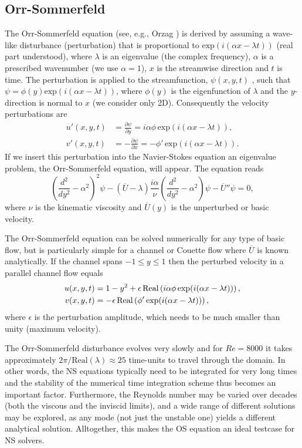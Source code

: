 \subsection{Orr-Sommerfeld}
\label{sec:OS}
The Orr-Sommerfeld equation (see, e.g., Orzag \cite{orzag71}) is derived by assuming a wave-like disturbance (perturbation) that is proportional to $\text{exp}(i(\alpha x-\lambda t))$ (real part understood), where $\lambda$ is an eigenvalue (the complex frequency), $\alpha$ is a prescribed wavenumber (we use $\alpha=1$), $x$ is the streamwise direction and $t$ is time. The perturbation is applied to the streamfunction, $\psi(x,y,t)$ , such that $\psi=\phi(y) \text{exp}(i(\alpha x- \lambda t))$, where $\phi(y)$ is the eigenfunction of $\lambda$ and the $y$-direction is normal to $x$ (we consider only 2D). Consequently the velocity perturbations are
\begin{align}
 u'(x,y,t)&=\frac{\partial \psi}{\partial y}=i\alpha \phi \, \text{exp}(i(\alpha x- \lambda t)),\\
 v'(x,y,t)&=-\frac{\partial \psi}{\partial x}=-\phi' \, \text{exp}(i(\alpha x- \lambda t)).
\end{align}
If we insert this perturbation into the Navier-Stokes equation an eigenvalue problem, the Orr-Sommerfeld equation, will appear. The equation reads
\begin{equation}
 \left( \frac{d^2}{dy^2}-\alpha^2\right)^2\psi - \left(\overline{U}-\lambda \right) \frac{i \alpha}{\nu} \left( \frac{d^2}{dy^2}-\alpha^2\right)\psi - \overline{U}''\psi=0,
 \label{eq:OrrS}
\end{equation}
where $\nu$ is the kinematic viscosity and $\overline{U}(y)$ is the unperturbed or basic velocity.

The Orr-Sommerfeld equation can be solved numerically for any type of basic flow, but is particularly simple for a channel or Couette flow where $\overline{U}$ is known analytically. If the channel spans $-1\leq y \leq 1$ then the perturbed velocity in a parallel channel flow equals
\begin{align}
 u(x,y,t)&=1-y^2+\epsilon \,\text{Real}\left(i\alpha \phi \, \text{exp}(i(\alpha x-\lambda t))\right), \notag \\
 v(x,y,t)&=-\epsilon \, \text{Real}\left(\phi' \, \text{exp}(i(\alpha x-\lambda t))\right),
\label{eq:channel}
\end{align}
where $\epsilon$ is the perturbation amplitude, which needs to be much smaller than unity (maximum velocity).

The Orr-Sommerfeld disturbance evolves very slowly and for $Re=8000$ it takes approximately $2 \pi/\text{Real}(\lambda)\approx 25$ time-units to travel through the domain. In other words, the NS equations typically need to be integrated for very long times and the stability of the numerical time integration scheme thus becomes an important factor. Furthermore, the Reynolds number may be varied over decades (both the viscous and the inviscid limits), and a wide range of different solutions may be explored, as any mode (not just the unstable one) yields a different analytical solution. Alltogether, this makes the OS equation an ideal testcase for NS solvers.


